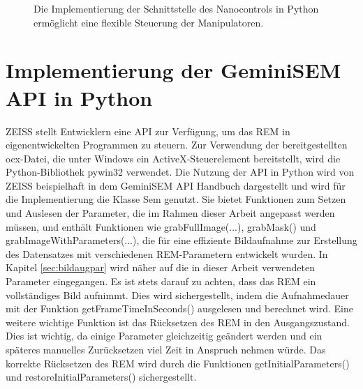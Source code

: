 \begin{figure}[h]
    \caption{Die Implementierung der Schnittstelle des Nanocontrols in Python ermöglicht eine flexible Steuerung der Manipulatoren.}
    \label{fig:ncumldiag}
\end{figure}
\newpage
\section{Implementierung der GeminiSEM API in Python}
ZEISS stellt Entwicklern eine API zur Verfügung, um das REM in eigenentwickelten Programmen zu steuern. Zur Verwendung der bereitgestellten ocx-Datei, die unter Windows ein ActiveX-Steuerelement bereitstellt, wird die Python-Bibliothek pywin32 verwendet.
Die Nutzung der API in Python wird von ZEISS beispielhaft in dem GeminiSEM API Handbuch dargestellt und wird für die Implementierung die Klasse \glqq Sem\grqq{} genutzt. Sie bietet Funktionen zum Setzen und Auslesen der Parameter, die im Rahmen dieser Arbeit angepasst werden müssen, und enthält Funktionen wie \glqq grabFullImage(...)\grqq{}, \glqq grabMask()\grqq{} und \glqq grabImageWithParameters(...)\grqq{}, die für eine effiziente Bildaufnahme zur Erstellung des Datensatzes mit verschiedenen REM-Parametern entwickelt wurden. In Kapitel \ref{sec:bildaugpar} wird näher auf die in dieser Arbeit verwendeten Parameter eingegangen.
Es ist stets darauf zu achten, dass das REM ein vollständiges Bild aufnimmt. Dies wird sichergestellt, indem die Aufnahmedauer mit der Funktion getFrameTimeInSeconds() ausgelesen und berechnet wird.
Eine weitere wichtige Funktion ist das Rücksetzen des REM in den Ausgangszustand. Dies ist wichtig, da einige Parameter gleichzeitig geändert werden und ein späteres manuelles Zurücksetzen viel Zeit in Anspruch nehmen würde. Das korrekte Rücksetzen des REM wird durch die Funktionen \glqq getInitialParameters()\grqq{} und \glqq restoreInitialParameters()\grqq{} sichergestellt.

